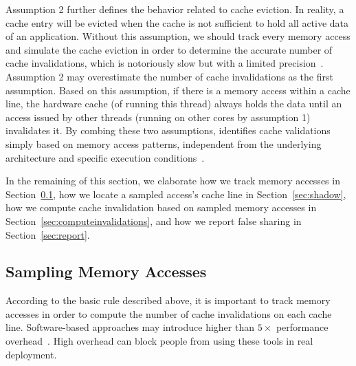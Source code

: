 Assumption 2 further defines the behavior related to cache eviction. In reality, a cache entry will be evicted when the cache is not sufficient to hold all active data of an application. Without this assumption, we should track every memory access and simulate the cache eviction in order to determine the accurate number of cache invalidations, which is notoriously slow but with a limited precision~\cite{falseshare:simulator}. Assumption 2 may overestimate the number of cache invalidations as the first assumption. Based on this assumption,  
if there is a memory access within a cache line, the hardware cache (of running this thread) always holds the data until an access issued by other threads (running on other cores by assumption 1) invalidates it. %
By combing these two assumptions, \cheetah{} identifies cache validations simply based on memory access patterns, independent from the underlying architecture and specific execution conditions~\cite{Predator, qinzhao}. 

In the remaining of this section, we elaborate how we track memory accesses in Section~\ref{sec:perfcounter}, how we locate a sampled access's cache line in Section~\ref{sec:shadow}, how we compute cache invalidation based on sampled memory accesses in Section~\ref{sec:computeinvalidations}, and how we report false sharing in Section~\ref{sec:report}.

\subsection{Sampling Memory Accesses}
\label{sec:perfcounter}

According to the basic rule described above, it is important to track memory accesses in order to compute the number of cache invalidations on each cache line. Software-based approaches may introduce higher than $5\times$ performance overhead~\cite{Predator, qinzhao}. High overhead can block people from using these tools in real deployment.


